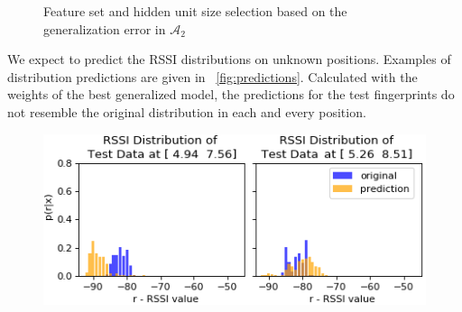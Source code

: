\documentclass[conference]{IEEEtran}
\begin{document}
{	%
	\begin{figure}[h]
		\centering
		\caption{Feature set and hidden unit size selection based on the generalization error in $\mathcal{A}_2$}
	\end{figure}
	
	We expect to predict the RSSI distributions on unknown positions. Examples of distribution predictions are given in \figurename~\ref{fig:predictions}. Calculated with the weights of the best generalized model, the predictions for the test fingerprints do not resemble the original distribution in each and every position. 
	\begin{figure}[h]
		\centering
		\includegraphics[width=0.8\linewidth]{Pred-Test-3-mini-3}
		

\end{figure}}
\end{document}
